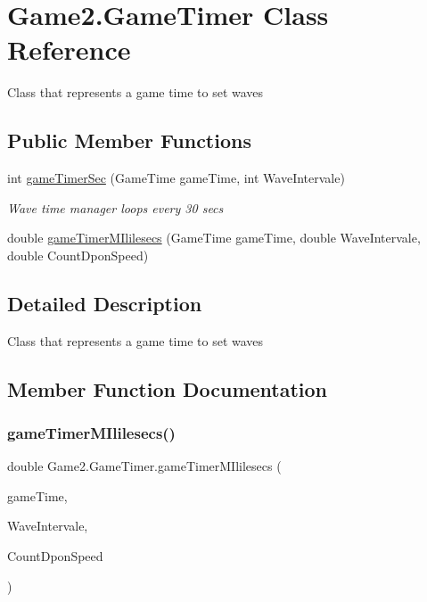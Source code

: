 \hypertarget{class_game2_1_1_game_timer}{}\section{Game2.\+Game\+Timer Class Reference}
\label{class_game2_1_1_game_timer}


Class that represents a game time to set waves  


\subsection*{Public Member Functions}
\begin{DoxyCompactItemize}
\item 
int \mbox{\hyperlink{class_game2_1_1_game_timer_ab343e6dcb30ffa2b96095b805be66b9f}{game\+Timer\+Sec}} (Game\+Time game\+Time, int Wave\+Intervale)
\begin{DoxyCompactList}\small\item\em Wave time manager loops every 30 secs \end{DoxyCompactList}\item 
double \mbox{\hyperlink{class_game2_1_1_game_timer_ad880ab8fa36bb0ba7a2d9896fb733062}{game\+Timer\+M\+Ililesecs}} (Game\+Time game\+Time, double Wave\+Intervale, double Count\+Dpon\+Speed)
\end{DoxyCompactItemize}


\subsection{Detailed Description}
Class that represents a game time to set waves 



\subsection{Member Function Documentation}
\mbox{\label{class_game2_1_1_game_timer_ad880ab8fa36bb0ba7a2d9896fb733062}} 
\subsubsection{\texorpdfstring{game\+Timer\+M\+Ililesecs()}{gameTimerMIlilesecs()}}
{\footnotesize\ttfamily double Game2.\+Game\+Timer.\+game\+Timer\+M\+Ililesecs (\begin{DoxyParamCaption}\item[{Game\+Time}]{game\+Time,  }\item[{double}]{Wave\+Intervale,  }\item[{double}]{Count\+Dpon\+Speed }\end{DoxyParamCaption})}

